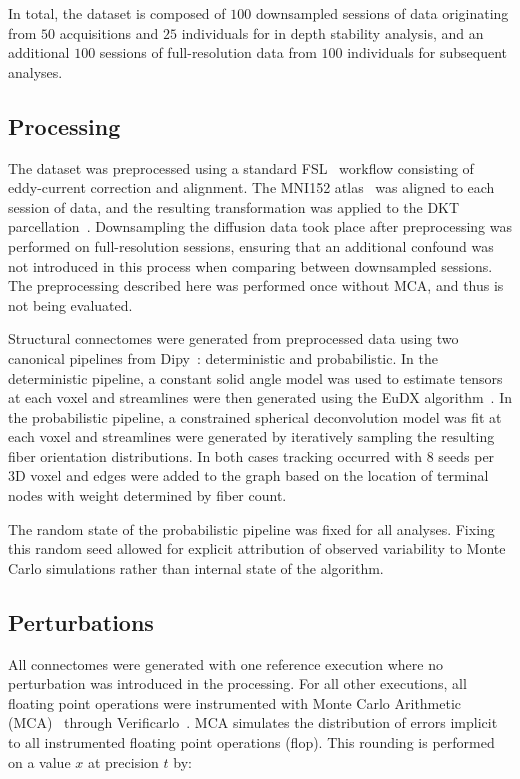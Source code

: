 \documentclass[fleqn,10pt]{SelfArx} %
\begin{document}
In total, the dataset is composed of $100$ downsampled sessions of data originating from $50$ acquisitions
and $25$ individuals for in depth stability analysis, and an additional $100$ sessions of full-resolution data from
$100$ individuals for subsequent analyses.


\subsection*{Processing}
The dataset was preprocessed using a standard FSL~\cite{Jenkinson2012-ly} workflow consisting of eddy-current
correction and alignment. The MNI152 atlas~\cite{lancaster2007bias} was aligned to each session of data, and the
resulting transformation was applied to the DKT parcellation~\cite{Klein2012-vi}. Downsampling the diffusion data took
place after preprocessing was performed on full-resolution sessions, ensuring that an additional confound was not
introduced in this process when comparing between downsampled sessions. The preprocessing described here was performed
once without MCA, and thus is not being evaluated.

Structural connectomes were generated from preprocessed data using two canonical pipelines from
Dipy~\cite{Garyfallidis2014-ql}: deterministic and probabilistic. In the deterministic pipeline, a constant solid angle
model was used to estimate tensors at each voxel and streamlines were then generated using the EuDX
algorithm~\cite{Garyfallidis2012-gg}. In the probabilistic pipeline, a constrained spherical deconvolution model was
fit at each voxel and streamlines were generated by iteratively sampling the resulting fiber orientation distributions.
In both cases tracking occurred with $8$ seeds per 3D voxel and edges were added to the graph based on the location of
terminal nodes with weight determined by fiber count.

The random state of the probabilistic pipeline was fixed for all analyses. Fixing this random seed allowed for explicit
attribution of observed variability to Monte Carlo simulations rather than internal state of the algorithm.

\subsection*{Perturbations}
All connectomes were generated with one reference execution where no perturbation was introduced in the processing. For
all other executions, all floating point operations were instrumented with Monte Carlo Arithmetic
(MCA)~\cite{Parker1997-qq} through Verificarlo~\cite{Denis2016-wo}. MCA simulates the distribution of errors implicit
to all instrumented floating point operations (flop). This rounding is performed on a value $x$ at precision $t$ by:
\end{document}
